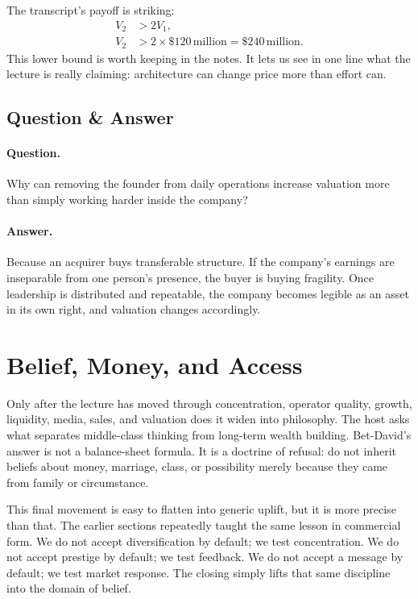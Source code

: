 The transcript's payoff is striking:
\begin{align}
V_2 &> 2V_1,\\
V_2 &> 2\times \$120\,\text{million} = \$240\,\text{million}.
\end{align}
This lower bound is worth keeping in the notes. It lets us see in one line what the lecture is really claiming: architecture can change price more than effort can.

\subsection{Question \& Answer}

\paragraph{Question.} Why can removing the founder from daily operations increase valuation more than simply working harder inside the company?

\paragraph{Answer.} Because an acquirer buys transferable structure. If the company's earnings are inseparable from one person's presence, the buyer is buying fragility. Once leadership is distributed and repeatable, the company becomes legible as an asset in its own right, and valuation changes accordingly.

\section{Belief, Money, and Access}

Only after the lecture has moved through concentration, operator quality, growth, liquidity, media, sales, and valuation does it widen into philosophy. The host asks what separates middle-class thinking from long-term wealth building. Bet-David's answer is not a balance-sheet formula. It is a doctrine of refusal: do not inherit beliefs about money, marriage, class, or possibility merely because they came from family or circumstance.

This final movement is easy to flatten into generic uplift, but it is more precise than that. The earlier sections repeatedly taught the same lesson in commercial form. We do not accept diversification by default; we test concentration. We do not accept prestige by default; we test feedback. We do not accept a message by default; we test market response. The closing simply lifts that same discipline into the domain of belief.

